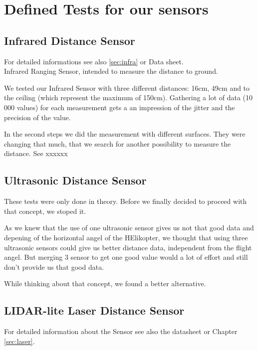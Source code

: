 
\chapter{Defined Tests for our sensors}
\label{sec:tests}


\section{Infrared Distance Sensor}
\label{sec:TestInfra}

For detailed informations see also \ref{sec:infra} or Data sheet.\\

Infrared Ranging Sensor, intended to measure the distance to ground.

We tested our Infrared Sensor with three different distances: 16cm, 49cm and to the ceiling (which represent the maximum of 150cm). Gathering a lot of data (10 000 values) for each measurement gets a an impression of the jitter and the precision of the value.

In the second steps we did the measurement with different surfaces. They were changing that much, that we search for another possibility to measure the distance. See xxxxxx


\section{Ultrasonic Distance Sensor}
\label{sec:TestUltrasonic}

These tests were only done in theory. Before we finally decided to proceed with that concept, we stoped it.

As we knew that the use of one ultrasonic sensor gives us not that good data and depening of the horizontal angel of the HElikopter, we thought that using three ultrasonic sensors could give us better distance data, independent from the flight angel. But merging 3 sensor to get one good value would a lot of effort and still don't provide us that good data.

While thinking about that concept, we found a better alternative.



\section{LIDAR-lite Laser Distance Sensor}
\label{sec:TestLaser}

For detailed information about the Sensor see also the datasheet or Chapter \ref{sec:laser}.\\

